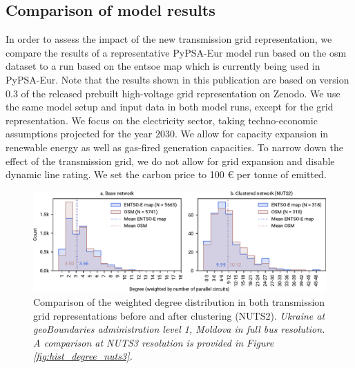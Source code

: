 \documentclass[fleqn,10pt]{wlscirep}
\let\autocite\cite
\begin{document}
\subsection*{Comparison of model results}
In order to assess the impact of the new transmission grid representation, we compare the results of a representative PyPSA-Eur model run based on the \gls{osm} dataset to a run based on the \acrshort{entsoe} map which is currently being used in PyPSA-Eur. \autocite{horschPyPSAEurOpenOptimisation2018} Note that the results shown in this publication are based on version 0.3 of the released prebuilt high-voltage grid representation on Zenodo.\autocite{xiongPrebuiltElectricityNetwork2024} We use the same model setup and input data in both model runs, except for the grid representation. We focus on the electricity sector, taking techno-economic assumptions projected for the year 2030. We allow for capacity expansion in renewable energy as well as gas-fired generation capacities. To narrow down the effect of the transmission grid, we do not allow for grid expansion and disable dynamic line rating. We set the carbon price to 100 \euro{} per tonne of  emitted.

\begin{figure}[!htbp]
    \centering
    \includegraphics{figures/fig_hist_degree_nuts2.pdf}
    \caption{Comparison of the weighted degree distribution in both transmission grid representations before and after clustering (NUTS2). \textit{Ukraine at geoBoundaries\autocite{runfolaGeoBoundariesGlobalDatabase2020} administration level 1, Moldova in full bus resolution. A comparison at NUTS3 resolution is provided in Figure \ref{fig:hist_degree_nuts3}.}}
    \label{fig:hist_degree_nuts2}
\end{figure}
\end{document}
